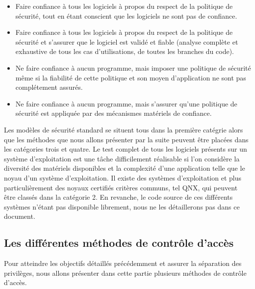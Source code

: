 \begin{itemize}
  \item Faire confiance à tous les logiciels à propos du respect de la politique de sécurité, tout en étant conscient que les logiciels ne sont pas de confiance.%
  \item Faire confiance à tous les logiciels à propos du respect de la politique de sécurité et s'assurer que le logiciel est validé et fiable (analyse complète et exhaustive de tous les cas d'utilisations, de toutes les branches du code).%
  \item Ne faire confiance à aucun programme, mais imposer une politique de sécurité même si la fiabilité de cette politique et son moyen d'application ne sont pas complétement assurés.%
  \item Ne faire confiance à aucun programme, mais s'assurer qu'une politique de sécurité est appliquée par des mécanismes matériels de confiance.%
\end{itemize}

Les modèles de sécurité standard se situent tous dans la première catégrie alors que les méthodes que nous allons présenter par la suite peuvent être placées dans les catégories trois et quatre. Le test complet de tous les logiciels présents sur un système d'exploitation est une tâche difficilement réalisable si l'on considère la diversité des matériels disponibles et la complexité d'une application telle que le noyau d'un système d'exploitation. Il existe des systèmes d'exploitation et plus particulièrement des noyaux certifiés critères communs, tel QNX\cite{QNX}, qui peuvent être classés dans la catégorie 2. En revanche, le code source de ces différents systèmes n'étant pas disponible librement, nous ne les détaillerons pas dans ce document.

\subsection{Les différentes méthodes de contrôle d'accès}

Pour atteindre les objectifs détaillés précédemment et assurer la séparation des privilèges, nous allons présenter dans cette partie plusieurs méthodes de contrôle d'accès.

